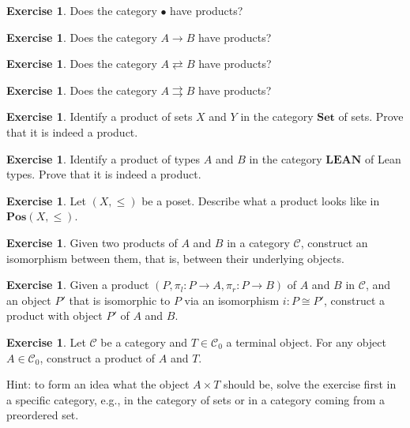 \documentclass[a4paper,10pt]{scrartcl}
\theoremstyle{plain}
\theoremstyle{definition}
\newtheorem{exer}[thm]{Exercise}
\newcommand{\Cat}[1]{\mathcal{#1}}
\newcommand{\CC}{\Cat{C}}
\newcommand{\Catb}[1]{\mathbf{#1}}
\newcommand{\SET}{\Catb{Set}}
\newcommand{\POS}{\Catb{Pos}}
\newcommand{\LEAN}{\Catb{LEAN}}
\newcommand{\Ob}[1]{{#1}_0}
\newcommand{\projl}{\ensuremath{\pi_l}}
\newcommand{\projr}{\ensuremath{\pi_r}}
\begin{document}
\begin{exer}
  Does the category $\bullet$ have products?
\end{exer}

\begin{exer}
  Does the category $A \to B$ have products?
\end{exer}

\begin{exer}
  Does the category $A \rightleftarrows B$ have products?
\end{exer}

\begin{exer}
  Does the category $A \rightrightarrows B$ have products?
\end{exer}


\begin{exer}
  Identify a product of sets $X$ and $Y$ in the category $\SET$ of sets.
  Prove that it is indeed a product.
\end{exer}

\begin{exer}
  Identify a product of types $A$ and $B$ in the category $\LEAN$ of Lean types.
  Prove that it is indeed a product.
\end{exer}

\begin{exer}
  Let $(X,\leq)$ be a poset. Describe what a product looks like in  $\POS(X,\leq)$.
\end{exer}

\begin{exer}\label{exer:product-unique}
  Given two products of $A$ and $B$ in a category $\CC$, construct an isomorphism between them, that is, between their underlying objects.
\end{exer}

\begin{exer}
  Given a product $(P,\projl : P \to A ,\projr : P \to B)$ of $A$ and $B$ in $\CC$, and an object $P'$ that is isomorphic to $P$ via an isomorphism $i : P \cong P'$, construct a product with object $P'$ of $A$ and $B$.
\end{exer}

\begin{exer} Let $\CC$ be a category and $T\in\Ob{\CC}$ a terminal object.
  For any object $A\in \Ob{\CC}$, construct a product of $A$ and $T$.

  Hint: to form an idea what the object $A \times T$ should be, solve the exercise first in a specific category, e.g., in the category of sets or in a category coming from a preordered set.
\end{exer}
\end{document}
